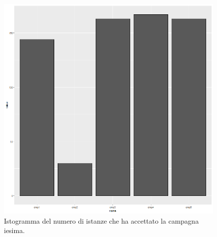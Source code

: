 \documentclass[letterpaper,11pt]{article}
\begin{document}
\begin{figure}[H]
\begin{minipage}[b]{0.4\textwidth}
    \includegraphics[width=\textwidth]{Img/EDA/EDA043.png}
    \caption{Istogramma del numero di istanze che ha accettato la campagna i\-esima.}
    \label{fig:IstogrammaTotalCampaign2}
  \end{minipage}
\end{figure}

\newpage
\end{document}
